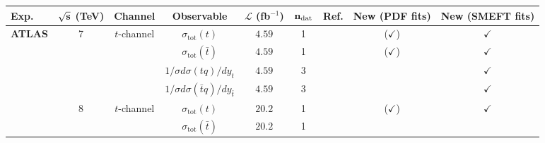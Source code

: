\begin{table}[t]
  \begin{center}
{\fontsize{8pt}{8pt}\selectfont
  \centering
   \renewcommand{\arraystretch}{2}
   \setlength{\tabcolsep}{5pt}
   \begin{tabular}{lcccccc|c|c}
     \toprule \textbf{Exp.}   & $\bf{\sqrt{s}}$ \textbf{(TeV)}    &   \textbf{Channel}
    &  \textbf{Observable} & $\mathcal{L}$ (fb${}^{-1}$) & $\mathbf{n_{\rm dat}}$ & \textbf{Ref.}
     &\textbf{New (PDF fits)}
    &  \textbf{New (SMEFT fits)}\\
    \toprule
    {\bf ATLAS}
    & 7
    & $t$-channel
    & $\sigma_\text{tot}(t)$ 
    & $4.59$
    & 1
    & \cite{ATLAS:2014sxe}
      & ($\checkmark$)                                                                    
      &   $\checkmark$     \\
    & 
    & 
    & $\sigma_\text{tot}(\bar{t})$ 
    & $4.59$
    & 1
    & \cite{ATLAS:2014sxe}
          & ($\checkmark$)                                                                    
      &   $\checkmark$     \\
    & 
    &
    & $1/\sigma d\sigma(tq)/dy_t$ 
    & $4.59$
    & 3
    & \cite{ATLAS:2014sxe}
     &                                                                  
      & $\checkmark$       \\
    & 
    &
    & $1/\sigma d\sigma(\bar{t}q)/dy_{\bar{t}}$ 
    & $4.59$
    & 3
    & \cite{ATLAS:2014sxe}
     &                                                                
    &  $\checkmark$      \\
    \midrule
    & 8
    & $t$-channel
    & $\sigma_{\text{tot}}(t)$
    & $20.2$
    & 1
    & \cite{Aaboud:2017pdi}
      & ($\checkmark$)                                                                    
      &  $\checkmark$      \\
    & 
    & 
    & $\sigma_{\text{tot}}(\bar{t})$
    & $20.2$
    & 1
    & \cite{Aaboud:2017pdi}

\end{tabular}}
\end{center}
\end{table}
